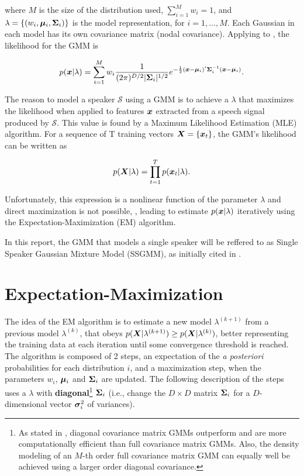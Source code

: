 \noindent where $M$ is the size of the distribution used, $\sum_{i=1}^M w_i = 1$, and $\lambda = \{(w_i, \boldsymbol{\mu}_i, \boldsymbol{\Sigma}_i)\}$ is the model representation, for $i = 1, ..., M$. Each Gaussian in each model has its own covariance matrix (nodal covariance). Applying  to , the likelihood for the GMM is

\begin{equation}
    \postpdf{\dvec{x}}{\lambda} = \dgaussianmixture.
    \label{eq:likelihood_gmm}
\end{equation}

The reason to model a speaker $\mathcal{S}$ using a GMM is to achieve a $\lambda$ that maximizes the likelihood when applied to features $\boldsymbol{x}$ extracted from a speech signal produced by $\mathcal{S}$. This value is found by a Maximum Likelihood Estimation (MLE) algorithm. For a sequence of T training vectors $\boldsymbol{X} = \{\boldsymbol{x}_t\}$, the GMM's likelihood can be written as

\begin{equation}
    \postpdf{\boldsymbol{X}}{\lambda} = \prod_{t=1}^T \postpdf{\dvec{x}_t}{\lambda}.
    \label{eq:likelihood_gmm_mle}
\end{equation}

\noindent Unfortunately, this expression is a nonlinear function of the parameter $\lambda$ and direct maximization is not possible, , leading to estimate $p(\boldsymbol{x}|\lambda)$ iteratively using the Expectation-Maximization (EM) algorithm.

In this report, the GMM that models a single speaker will be reffered to as Single Speaker Gaussian Mixture Model (SSGMM), as initially cited in .

\section{Expectation-Maximization}
\label{sec:em}

The idea of the EM algorithm is to estimate a new model $\lambda^{(k+1)}$ from a previous model $\lambda^{(k)}$, that obeys $p(\boldsymbol{X}|\lambda^{(k+1)}) \geq p(\boldsymbol{X}|\lambda^{(k)})$, better representing the training data at each iteration until some convergence threshold is reached. The algorithm is composed of 2 steps, an expectation of the \emph{a posteriori} probabilities for each distribution $i$, and a maximization step, when the parameters $w_i$, $\boldsymbol{\mu}_i$ and $\boldsymbol{\Sigma}_i$ are updated. The following description of the steps uses a $\lambda$ with \textbf{diagonal}\footnote{As stated in , diagonal covariance matrix GMMs outperform and are more computationally efficient than full covariance matrix GMMs. Also, the density modeling of an $M$-th order full covariance matrix GMM can equally well be achieved using a larger order diagonal covariance.} $\boldsymbol{\Sigma}_i$ (i.e., change the $D \times D$ matrix $\boldsymbol{\Sigma}_i$ for a $D$-dimensional vector $\boldsymbol{\sigma}_i^2$ of variances).


